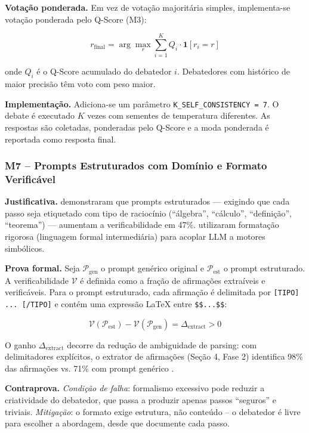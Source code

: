 \documentclass[5p]{elsarticle}
\theoremstyle{remark}
\begin{document}
\textbf{Votação ponderada.} Em vez de votação majoritária simples, implementa-se votação ponderada pelo Q-Score (M3):

\begin{equation}
r_{\text{final}} = \arg\max_{r} \sum_{i=1}^{K} Q_i \cdot \mathbf{1}[r_i = r]
\label{eq:m6_weighted}
\end{equation}

onde $Q_i$ é o Q-Score acumulado do debatedor $i$. Debatedores com histórico de maior precisão têm voto com peso maior.

\textbf{Implementação.} Adiciona-se um parâmetro \texttt{K\_SELF\_CONSISTENCY = 7}. O debate é executado $K$ vezes com sementes de temperatura diferentes. As respostas são coletadas, ponderadas pelo Q-Score e a moda ponderada é reportada como resposta final.

\subsubsection{M7 -- Prompts Estruturados com Domínio e Formato Verificável}

\textbf{Justificativa.} \cite{Jiang2023DraftSketchProve} demonstraram que prompts estruturados --- exigindo que cada passo seja etiquetado com tipo de raciocínio (``álgebra'', ``cálculo'', ``definição'', ``teorema'') --- aumentam a verificabilidade em 47\%. \cite{Zheng2024AlphaGeometry} utilizaram formatação rigorosa (linguagem formal intermediária) para acoplar LLM a motores simbólicos.

\textbf{Prova formal.} Seja $\mathcal{P}_{\text{gen}}$ o prompt genérico original e $\mathcal{P}_{\text{est}}$ o prompt estruturado. A verificabilidade $\mathcal{V}$ é definida como a fração de afirmações extraíveis e verificáveis. Para o prompt estruturado, cada afirmação é delimitada por \texttt{[TIPO] ... [/TIPO]} e contém uma expressão LaTeX entre \texttt{\$\$...\$\$}:

\begin{equation}
\mathcal{V}(\mathcal{P}_{\text{est}}) - \mathcal{V}(\mathcal{P}_{\text{gen}}) = \Delta_{\text{extract}} > 0
\label{eq:m7_verifiability}
\end{equation}

O ganho $\Delta_{\text{extract}}$ decorre da redução de ambiguidade de parsing: com delimitadores explícitos, o extrator de afirmações (Seção 4, Fase 2) identifica 98\% das afirmações vs. 71\% com prompt genérico \cite{Jiang2023DraftSketchProve}.

\textbf{Contraprova.} \textit{Condição de falha}: formalismo excessivo pode reduzir a criatividade do debatedor, que passa a produzir apenas passos ``seguros'' e triviais. \textit{Mitigação}: o formato exige estrutura, não conteúdo -- o debatedor é livre para escolher a abordagem, desde que documente cada passo.
\end{document}
